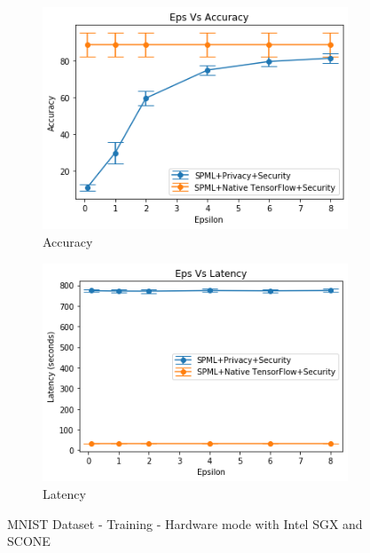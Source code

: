 \begin{figure}
\begin{subfigure}{0.5\textwidth}
         \includegraphics[width=\textwidth]{images/Training/MnistHWAccuracy.png}
         \caption{Accuracy}
         \label{fig:hwMnistAccuracyTraining}
     \end{subfigure}
     \begin{subfigure}{0.5\textwidth}
         \includegraphics[width=\textwidth]{images/Training/MnistHWLatency.png}
         \caption{Latency}
         \label{fig:hwMnistLatencyTraining}
     \end{subfigure}
        \caption{MNIST Dataset - Training - Hardware mode with Intel SGX and SCONE}
\end{figure}

